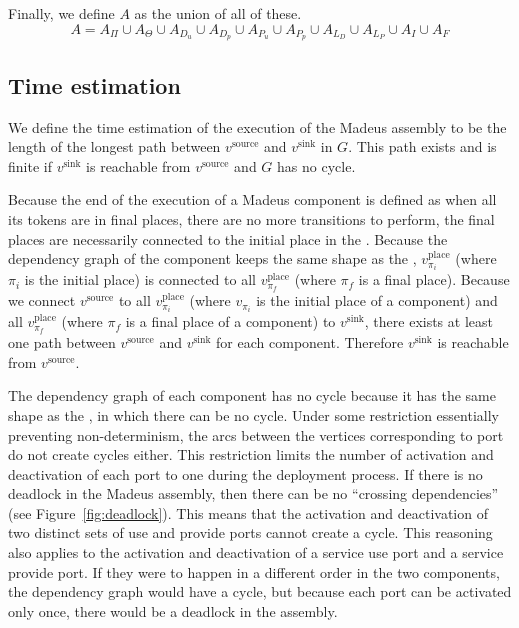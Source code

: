 Finally, we define $A$ as the union of all of these. 
\[
A=A_\Pi\cup A_{\Theta}\cup A_{D_{u}}\cup A_{D_{p}}\cup A_{P_{u}}\cup A_{P_{p}}\cup A_{L_{D}}\cup A_{L_{P}}\cup A_{I}\cup A_{F}
\]


\subsection{Time estimation}

We define the time estimation of the execution of the Madeus assembly
to be the length of the longest path between $v^\text{source}$ and
$v^\text{sink}$ in $G$. This path exists and is finite if $v^\text{sink}$ 
is reachable from $v^\text{source}$ and $G$ has no cycle.

Because the end of the execution of a Madeus component is defined as
when all its tokens are in final places, \ie there are no more transitions
to perform, the final places are necessarily connected to the initial place
in the \net. Because the dependency graph of the component keeps the same
shape as the \net, $v_{\pi_i}^\text{place}$ (where $\pi_i$ is the initial
place) is connected to all $v_{\pi_f}^\text{place}$ (where $\pi_f$ is a
final place). Because we connect $v^\text{source}$ to all
$v_{\pi_i}^\text{place}$ (where $v_{\pi_i}$ is the initial place of a
component) and all $v_{\pi_f}^\text{place}$ (where $\pi_f$ is a final place
of a component) to $v^\text{sink}$, there exists at least one path between
$v^\text{source}$ and $v^\text{sink}$ for each component. Therefore
$v^\text{sink}$ is reachable from $v^\text{source}$.

The dependency graph of each component has no cycle because it has the same
shape as the \net, in which there can be no cycle. Under some restriction
essentially preventing non-determinism, the arcs between the vertices
corresponding to port do not create cycles either. This restriction limits
the number of activation and deactivation of each port to one during the
deployment process. If there is no deadlock in the Madeus assembly, then
there can be no ``crossing dependencies'' (see Figure~\ref{fig:deadlock}). This means that
the activation and deactivation of two distinct sets of use and provide
ports cannot create a cycle. This reasoning also applies to the activation
and deactivation of a service use port and a service provide port. If they
were to happen in a different order in the two components, the dependency
graph would have a cycle, but because each port can be activated only once,
there would be a deadlock in the assembly.

